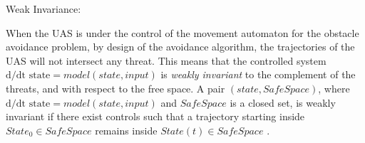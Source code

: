 \begin{note}{Weak Invariance:}

When the UAS is under the control of the movement automaton  for the obstacle avoidance problem,  by design of the avoidance algorithm, the trajectories of the UAS will not intersect any threat. This means that the controlled system $\text{d}/\text{d} \text{t state} =model(state,input)$ is \emph{weakly invariant} to the complement of the threats, and with respect to the free space. A pair $(state, SafeSpace)$, where $\text{d}/\text{d} \text{t state} =model(state,input)$ and $SafeSpace$ is a closed set, is weakly invariant if there exist controls such that a trajectory starting inside $State_0\in SafeSpace$ remains inside $State (t)\in SafeSpace$ \cite{blanchini1999set}.
 \end{note}



